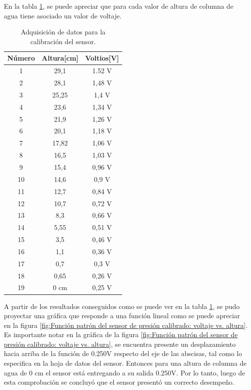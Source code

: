 En la tabla \ref{tab:calibración del sensor-función patrón}, se puede apreciar que para cada valor de altura de columna de agua tiene asociado un valor de voltaje.  
\begin{table}[htpb]
	\centering
	\caption[Adquisición de datos para la calibración del sensor]{Adquisición de datos para la calibración del sensor.}
	\begin{tabular}{c c c}    
		\toprule
		\textbf{Número}     & \textbf{Altura[cm]} & \textbf{Voltios[V]} \\
		\midrule
		1  & 29,1          &  1.52 V \\		
		2  & 28,1          &  1,48 V \\
		3  & 25,25         &  1,4 V \\
		4  & 23,6          &  1,34 V \\
		5  & 21,9          & 1,26 V \\
		6  & 20,1          & 1,18 V \\
		7  & 17,82         & 1,06 V \\
		8  & 16,5          & 1,03 V \\
		9  & 15,4          & 0,96 V \\
		10 & 14,6          & 0,9 V \\
		11 & 12,7          & 0,84 V \\
		12 & 10,7          & 0,72 V \\
		13 & 8,3           & 0,66  V \\
		14 & 5,55          & 0,51 V \\
		15 & 3,5           & 0,46 V \\
		16 & 1,1           & 0,36 V \\
		17 & 0,7           & 0,3 V \\
		18 & 0,65          & 0,26 V \\
		19 & 0 cm          & 0,25 V \\
	
		\bottomrule
		\hline
	\end{tabular}
	\label{tab:calibración del sensor-función patrón}
\end{table}
A partir de los resultados conseguidos como se puede ver en la tabla \ref{tab:calibración del sensor-función patrón}, se pudo proyectar una gráfica que responde a una función lineal como se puede apreciar en la figura \ref{fig:Función patrón del sensor de presión calibrado: voltaje vs. altura}. 
Es importante notar en la gráfica de la figura \ref{fig:Función patrón del sensor de presión calibrado: voltaje vs. altura}, se encuentra presente un desplazamiento hacia arriba de la función de 0.250V respecto del eje de las abscisas, tal como lo especifica en la hoja de datos del sensor. Entonces para una altura de columna de agua de 0 cm el sensor está entregando a su salida 0.250V. 
Por lo tanto, luego de esta comprobación se concluyó que el sensor presentó un correcto desempeño.

